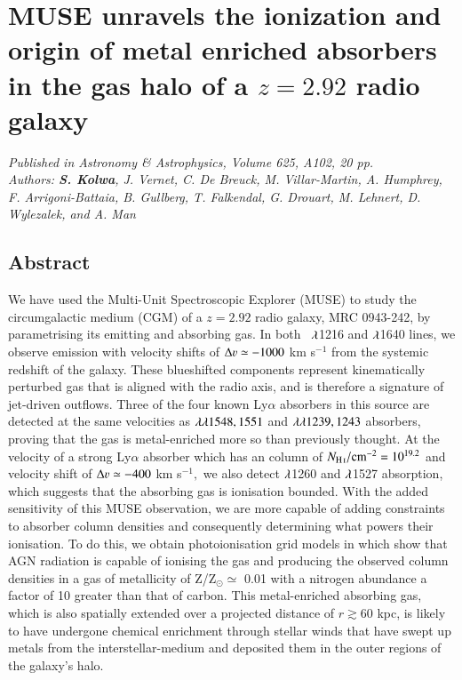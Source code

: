 \chapter[The ionization of metal-rich absorbers in a $z=2.92$ radio galaxy halo]{MUSE unravels the ionization and origin of metal enriched absorbers in the gas halo of a $z = 2.92$ radio galaxy }

{\it Published in Astronomy \& Astrophysics, Volume 625, A102, 20 pp.\\
Authors: {\bf S. Kolwa},
J. Vernet,
C. De Breuck,
M. Villar-Martin,
A. Humphrey,
F. Arrigoni-Battaia,
B. Gullberg,
T. Falkendal,
G. Drouart,
M. Lehnert,
D. Wylezalek, and 
A. Man}    \\

\section*{Abstract}
We have used the Multi-Unit Spectroscopic Explorer (MUSE) to study the circumgalactic medium (CGM) of a $z = 2.92$ radio galaxy, MRC 0943-242, by parametrising its emitting and absorbing gas. In both \lya~$\lambda$1216 and  $\lambda$1640 lines, we observe emission with velocity shifts of $\Delta \varv \simeq-1000$ km s$^{-1}$ from the systemic redshift of the galaxy. These blueshifted components represent kinematically perturbed gas that is aligned with the radio axis, and is therefore a signature of jet-driven outflows. Three of the four known Ly$\alpha$ absorbers in this source are detected at the same velocities as  $\lambda\lambda1548,1551$ and  $\lambda\lambda1239,1243$ absorbers, proving that the gas is metal-enriched more so than previously thought. At the velocity of a strong Ly$\alpha$ absorber which has an  column of $N_\ion{H}{I}/{\rm cm}^{-2} = 10^{19.2}$ and velocity shift of $\Delta \varv \simeq -400$ km s$^{-1},$ we also detect  $\lambda$1260 and  $\lambda$1527 absorption, which suggests that the absorbing gas is ionisation bounded. With the added sensitivity of this MUSE observation, we are more capable of adding constraints to absorber column densities and consequently determining what powers their ionisation. To do this, we obtain photoionisation grid models in  which show that AGN radiation is capable of ionising the gas and producing the observed column densities in a gas of metallicity of Z/Z$_\odot \simeq$ 0.01 with a nitrogen abundance a factor of 10 greater than that of carbon. This metal-enriched absorbing gas, which is also spatially extended over a projected distance of $r \gtrsim 60$ kpc, is likely to have undergone chemical enrichment through stellar winds that have swept up metals from the interstellar-medium and deposited them in the outer regions of the galaxy's halo.

